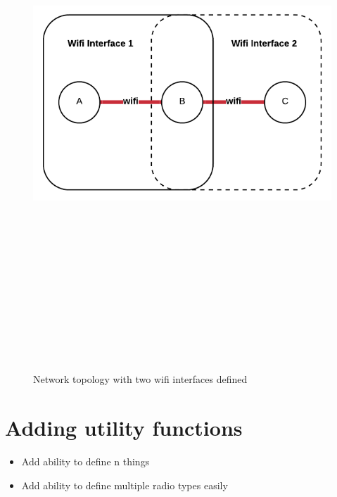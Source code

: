\begin{figure}
    \begin{centering}
        \includegraphics[width=14cm,height=20cm,keepaspectratio]{Figures/networkWifiInterface2.png}
        \caption{Network topology with two wifi interfaces defined}
        \label{fig:networkWifi2}
    \end{centering}
\end{figure}


\section{Adding utility functions}
\begin{itemize}
    \item Add ability to define {n} things
    \item Add ability to define multiple radio types easily
\end{itemize}


